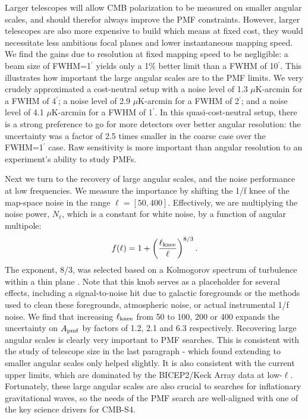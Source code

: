 \documentclass[preprint]{emulateapj}
\newcommand{\apmf}{\ensuremath{A_{\rm pmf}}}
\newcommand{\ukarcmin}{\ensuremath{\mu}K-arcmin}
\newcommand{\lknee}{\ensuremath{\ell_{\rm knee}}}
\newcommand{\be}{\begin{equation}}
\newcommand{\ee}{\end{equation}}
\begin{document}
Larger telescopes will allow CMB polarization to be measured on smaller angular scales, and should therefor always improve the PMF constraints. 
However, larger telescopes are also more expensive to build which means at fixed cost, they would necessitate less ambitious focal planes and lower instantaneous mapping speed. 
We find the gains due to resolution at fixed mapping speed to be negligible: a beam size of FWHM=1$^\prime$ yields only a 1\% better limit than a FWHM of 10$^\prime$. 
This illustrates how important the large angular scales are to the PMF limits. 
We very crudely approximated a cost-neutral setup with a noise level of 1.3 \ukarcmin{} for a FWHM of 4$^\prime$; a noise level of 2.9 \ukarcmin{} for a FWHM of 2$^\prime$; and a noise level of 4.1 \ukarcmin{} for a FWHM of 1$^\prime$. 
In this quasi-cost-neutral setup, there is a strong preference to go for more detectors over better angular resolution: the uncertainty was a factor of 2.5 times smaller in the coarse case over the FWHM=1$^\prime$ case. 
Raw sensitivity is more important than angular resolution to an experiment's ability to study PMFs.

Next we turn to the recovery of large angular scales, and the noise performance at low frequencies. 
We measure the importance by shifting the 1/f knee of the map-space noise in the range $\ell = [50,400]$. 
Effectively, we are multiplying the noise power, $N_\ell$, which is a constant for white noise,  by a function of angular multipole:
\be
f(\ell) = 1 + \left(\frac{\ell_{\rm knee}}{\ell}\right)^{8/3}. 
\ee 
The exponent, 8/3, was selected based on a Kolmogorov spectrum of turbulence within a thin plane \citep{lay00}. %
Note that this knob  serves as a placeholder for several effects, including a signal-to-noise hit due to galactic foregrounds or the methods used to clean these foregrounds, atmospheric noise, or actual instrumental 1/f noise. 
We find that increasing \lknee{} from 50 to 100, 200 or 400 expands the uncertainty on \apmf{} by factors of 1.2, 2.1 and 6.3 respectively. 
Recovering large angular scales is clearly very important to PMF searches. 
This is consistent with the study of telescope size in the last paragraph - which found extending to smaller angular scales only helped slightly. 
It is also consistent with the current upper limits, which are dominated by the BICEP2/Keck Array data at low-$\ell$. 
Fortunately, these large angular scales are also crucial to searches for inflationary gravitational waves, so the needs of the PMF search are well-aligned with one of the key science drivers for CMB-S4.
\end{document}
